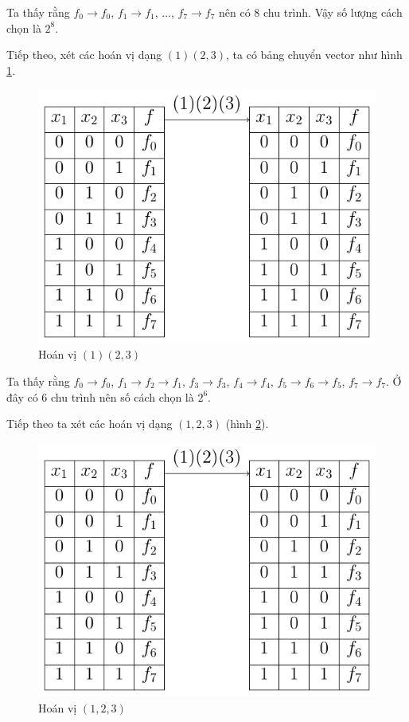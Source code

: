 Ta thấy rằng $f_0 \to f_0$, $f_1 \to f_1$, ..., $f_7 \to f_7$ nên có 8 chu trình. Vậy số lượng cách chọn là $2^8$.

Tiếp theo, xét các hoán vị dạng $(1)(2, 3)$, ta có bảng chuyển vector như hình \ref{burnside:second}.

\begin{figure}[ht]
    \centering
    \includegraphics[page=2]{figures/burnside.pdf}
    \caption{Hoán vị $(1)(2, 3)$}
    \label{burnside:second}
\end{figure}

Ta thấy rằng $f_0 \to f_0$, $f_1 \to f_2 \to f_1$, $f_3 \to f_3$, $f_4 \to f_4$, $f_5 \to f_6 \to f_5$, $f_7 \to f_7$. Ở đây có 6 chu trình nên số cách chọn là $2^6$.

Tiếp theo ta xét các hoán vị dạng $(1, 2, 3)$ (hình \ref{burnside:third}).

\begin{figure}[ht]
    \centering
    \includegraphics[page=3]{figures/burnside.pdf}
    \caption{Hoán vị $(1, 2, 3)$}
    \label{burnside:third}
\end{figure}

